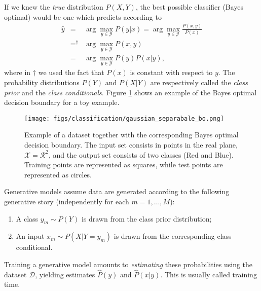 If we knew the \emph{true} distribution $P(X,Y)$, the best possible classifier (Bayes optimal) 
would be one which predicts according to
\begin{eqnarray}
{\hat y} &=& \arg\max_{y \in \mathcal{Y}} P(y|x) = \arg\max_{y \in \mathcal{Y}} \frac{P(x,y)}{P(x)} \nonumber\\
&=^{\dagger}& \arg\max_{y \in \mathcal{Y}} P(x,y) \nonumber \\
&=& \arg\max_{y \in \mathcal{Y}} P(y) P(x|y),
\end{eqnarray}
where in ${\dagger}$ we used the fact that $P(x)$ is constant with respect to $y$. 
The probability distributions $P(Y)$ and $P(X|Y)$ are respectively
called the \emph{class prior} and the \emph{class
  conditionals}. Figure \ref{simpleDataSet_bo} shows an example of
the Bayes optimal decision boundary for a toy example.  
\begin{figure}
\begin{center}
    \texttt{[image: figs/classification/gaussian\_separabale\_bo.png]}
  \caption{\label{simpleDataSet_bo} Example of a dataset together with
    the corresponding Bayes optimal decision boundary.
    The input set consists in points in the real plane, $\mathcal{X} =
    \mathcal{R^2}$, and the output set consists of two classes (Red
    and Blue). Training points are represented as squares, while test
    points are represented as circles.}
  \end{center}
\end{figure}
Generative models assume data are generated according to the following generative story (independently for each $m=1,\ldots,M$): 
\begin{enumerate}
\item A class $y_m \sim P(Y)$ is drawn from the class prior distribution;
\item An input $x_m \sim P(X|Y=y_m)$ is drawn from the corresponding class conditional.
\end{enumerate}
Training a generative model 
amounts to \emph{estimating} these probabilities using the dataset $\mathcal{D}$, yielding estimates 
$\hat{P}(y)$ and $\hat{P}(x|y)$. This is usually called training time.

